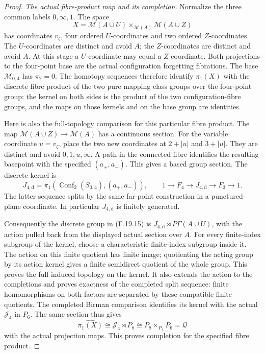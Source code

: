 \begin{proof}
\emph{The actual fibre-product map and its completion.}
Normalize the three common labels \(0,\infty,1\).
The space
\[
 X=\mathcal M(A\cup U)
          \times_{\mathcal M(A)}\mathcal M(A\cup Z)
                                                               \tag{F.19.15}
\]
has coordinates \(v_\zeta\), four ordered \(U\)-coordinates
and two ordered \(Z\)-coordinates.
The \(U\)-coordinates are distinct and avoid \(A\);
the \(Z\)-coordinates are distinct and avoid \(A\).
At this stage a \(U\)-coordinate may equal a
\(Z\)-coordinate.
Both projections to the four-point base are the
actual configuration forgetting fibrations.
The base \(\mathcal M_{0,4}\) has \(\pi_2=0\).
The homotopy sequences therefore identify \(\pi_1(X)\)
with the discrete fibre product of the two pure
mapping class groups over the four-point group:
the kernel on both sides is the product of the
two configuration-fibre groups, and the maps on
those kernels and on the base group are identities.

Here is also the full-topology comparison for this
particular fibre product.
The map \(\mathcal M(A\cup Z)\to\mathcal M(A)\)
has a continuous section.  For the variable coordinate
\(u=v_\zeta\), place the two new coordinates at
\(2+|u|\) and \(3+|u|\).
They are distinct and avoid \(0,1,u,\infty\).
A path in the connected fibre identifies the
resulting basepoint with the specified \((a_+,a_-)\).
This gives a based group section.
The discrete kernel is
\[
 J_{4,\mathrm d}
   =\pi_1(\operatorname{Conf}_2(S_{0,4}),(a_+,a_-)),
 \qquad
 1\longrightarrow F_4\longrightarrow J_{4,\mathrm d}
                     \longrightarrow F_3\longrightarrow1 .
                                                               \tag{F.19.16}
\]
The latter sequence splits by the same far-point
construction in a punctured-plane coordinate.
In particular \(J_{4,\mathrm d}\) is finitely generated.

Consequently the discrete group in (F.19.15) is
\(J_{4,\mathrm d}\rtimes P\Gamma(A\cup U)\), with
the action pulled back from the displayed actual
section over \(A\).
For every finite-index subgroup of the kernel,
choose a characteristic finite-index subgroup inside
it.  The action on this finite quotient has finite
image; quotienting the acting group by its action
kernel gives a finite semidirect quotient of the
whole group.  This proves the full induced topology
on the kernel.  It also extends the action to the
completions and proves exactness of the completed
split sequence: finite homomorphisms on both factors
are separated by these compatible finite quotients.
The completed Birman comparison identifies its kernel
with the actual \(\mathcal J_4\) in \(P_6\).
The same section thus gives
\[
 \widehat{\pi_1(X)}
   \cong\mathcal J_4\rtimes P_8
   \cong P_8\times_{P_4}P_6=\mathcal Q
                                                               \tag{F.19.17}
\]
with the actual projection maps.
This proves completion for the specified fibre product.


\end{proof}
